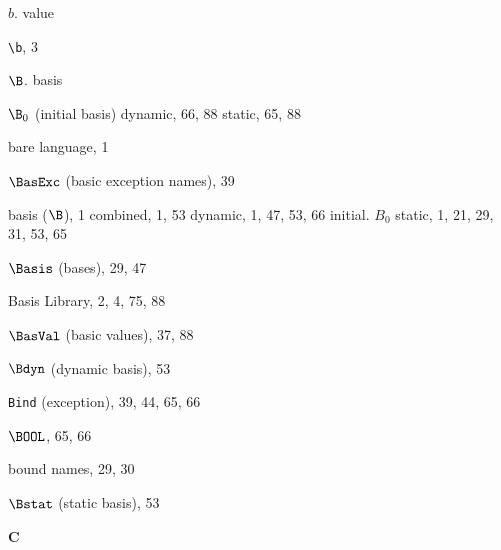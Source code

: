 \begin{theindex}
\indexspace
\item $b$. \see value
\item \verb+\b+, 3
\item $\B$. \see basis
\item $\B_0$ (initial basis)
\subitem dynamic, 66, 88
\subitem static, 65, 88
\item bare language, 1
\item $\BasExc$ (basic exception names), 39
\item basis ($\B$), 1
\subitem combined, 1, 53
\subitem dynamic, 1, 47, 53, 66
\subitem initial. \see $B_0$
\subitem static, 1, 21, 29, 31, 53, 65
\item $\Basis$ (bases), 29, 47
\item Basis Library, 2, 4, 75, 88
\item $\BasVal$ (basic values), 37, 88
\item $\Bdyn$ (dynamic basis), 53
\item {\tt Bind} (exception), 39, 44, 65, 66
\item $\BOOL$, 65, 66
\item bound names, 29, 30
\item $\Bstat$ (static basis), 53
\indexspace

\parbox{64mm}{\hfil{\large\bf C}\hfil}

\indexspace


\end{theindex}

